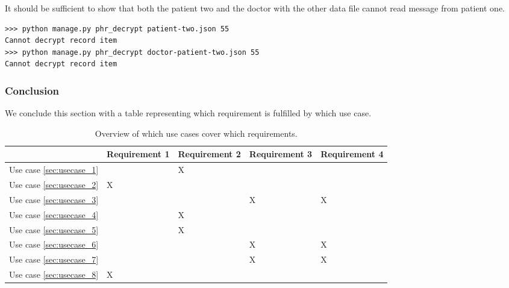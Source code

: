 \documentclass[a4paper]{article}
\begin{document}
			It should be sufficient to show that both the patient two and the doctor with the other data file cannot read message from patient one.
			
			\begin{lstlisting}
>>> python manage.py phr_decrypt patient-two.json 55
Cannot decrypt record item
>>> python manage.py phr_decrypt doctor-patient-two.json 55
Cannot decrypt record item
			\end{lstlisting}
		
		\subsubsection{Conclusion}
			We conclude this section with a table representing which requirement is fulfilled by which use case.

			\begin{table}[h!]
				\center
			    \begin{tabular}{| l | l | l | l | l |} \hline
			    ~                            & Requirement 1 & Requirement 2 & Requirement 3 & Requirement 4 \\ \hline
			    Use case \ref{sec:usecase_1} & ~             & X             & ~             & ~             \\ \hline
			    Use case \ref{sec:usecase_2} & X             & ~             & ~             & ~             \\ \hline
			    Use case \ref{sec:usecase_3} & ~             & ~             & X             & X             \\ \hline
			    Use case \ref{sec:usecase_4} & ~             & X             & ~             & ~             \\ \hline
			    Use case \ref{sec:usecase_5} & ~             & X             & ~             & ~             \\ \hline
			    Use case \ref{sec:usecase_6} & ~             & ~             & X             & X             \\ \hline
			    Use case \ref{sec:usecase_7} & ~             & ~             & X             & X             \\ \hline
			    Use case \ref{sec:usecase_8} & X             & ~             & ~             & ~             \\ \hline
			    \end{tabular}
			
				\caption{Overview of which use cases cover which requirements.}
			\end{table}
	
\end{document}
